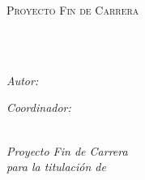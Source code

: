 \documentclass[
11pt, %
{english, spanish}, %
singlespacing, %
headsepline, %
]{MastersDoctoralThesis} %
\author{Marcial \textsc{Rodríguez}} %
\begin{document}
\frontmatter %

\pagestyle{plain} %


\begin{titlepage}
\begin{center}

\vspace*{.06\textheight}
{\scshape\LARGE \univname\par}\vspace{0.1cm} %
{\scshape\Large \facname\par}\vspace{0.8cm} %
\textsc{\Large Proyecto Fin de Carrera}\\[0.2cm] %

\HRule \\[0.6cm] %
{\huge \bfseries \ttitle\par}\vspace{0.2cm} %
\HRule \\[1.2cm] %

\begin{minipage}[t]{0.4\textwidth}
\begin{flushleft} \large
\emph{Autor:}\\
\href{http://uborzz.es}{\authorname} %
\end{flushleft}
\end{minipage}
\begin{minipage}[t]{0.4\textwidth}
\begin{flushright} \large
\emph{Coordinador:} \\
\href{}{\supname} %
\end{flushright}
\end{minipage}\\[0.1cm]

\vfill
\large \textit{Proyecto Fin de Carrera \\ para la titulación de \degreename}\\[0.3cm] %


\end{center}
\end{titlepage}
\end{document}
